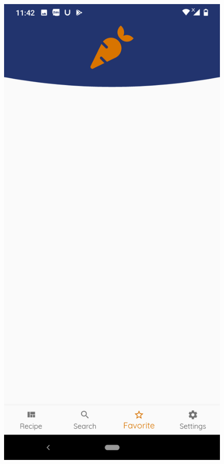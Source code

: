 \documentclass{article}
\begin{document}
\begin{figure}[h!]
    \includegraphics[scale=0.1]{Images/Favorite.jpg}

\end{figure}
\end{document}
